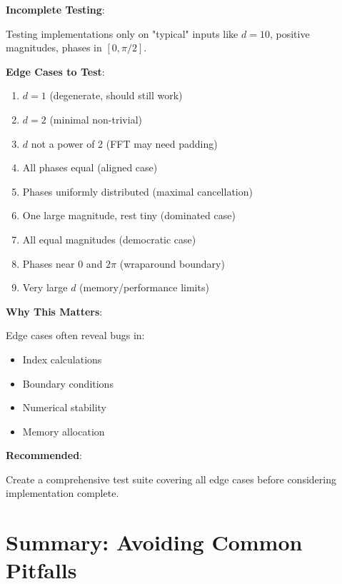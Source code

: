 \begin{warning}
\textbf{Incomplete Testing}:

Testing implementations only on "typical" inputs like $d=10$, positive magnitudes, phases in $[0, \pi/2]$.

\textbf{Edge Cases to Test}:

\begin{enumerate}
\item $d=1$ (degenerate, should still work)
\item $d=2$ (minimal non-trivial)
\item $d$ not a power of 2 (FFT may need padding)
\item All phases equal (aligned case)
\item Phases uniformly distributed (maximal cancellation)
\item One large magnitude, rest tiny (dominated case)
\item All equal magnitudes (democratic case)
\item Phases near $0$ and $2\pi$ (wraparound boundary)
\item Very large $d$ (memory/performance limits)
\end{enumerate}

\textbf{Why This Matters}:

Edge cases often reveal bugs in:
\begin{itemize}
\item Index calculations
\item Boundary conditions
\item Numerical stability
\item Memory allocation
\end{itemize}

\textbf{Recommended}:

Create a comprehensive test suite covering all edge cases before considering implementation complete.
\end{warning}

\section{Summary: Avoiding Common Pitfalls}

